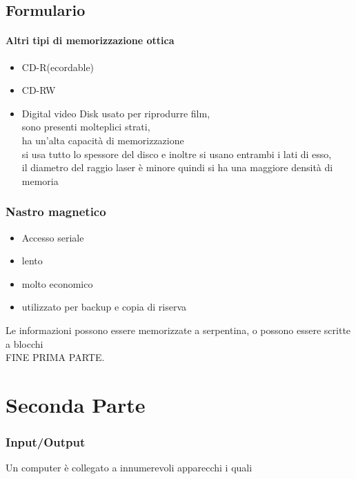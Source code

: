 \documentclass[12pt, a4paper]{report}
\begin{document}
\section{Formulario}



\subsubsection{Altri tipi di memorizzazione ottica}%
\label{subsub:altri_tipi_di_memorizzazione_ottica}

\begin{itemize}
	\item CD-R(ecordable)
	\item CD-RW
	\item Digital video Disk
		usato per riprodurre film, \\
		sono presenti molteplici strati,\\
		ha un'alta capacità di memorizzazione\\
		si usa tutto lo spessore del disco e inoltre si usano entrambi i
		lati di esso,\\
		il diametro del raggio laser è minore quindi si ha una maggiore 
		densità di memoria 

\end{itemize}

\subsection{Nastro magnetico}%
\label{sub:nastro_magnetico}

\begin{itemize}
	\item Accesso seriale
	\item lento
	\item molto economico 
	\item utilizzato per backup e copia di riserva
\end{itemize}
Le informazioni possono essere memorizzate a serpentina, o possono essere scritte 
a blocchi\\

{\Huge FINE PRIMA PARTE.}

\chapter{Seconda Parte}
\subsection{Input/Output}%
\label{sub:input_output}
Un computer è collegato a innumerevoli apparecchi i quali
\end{document}

